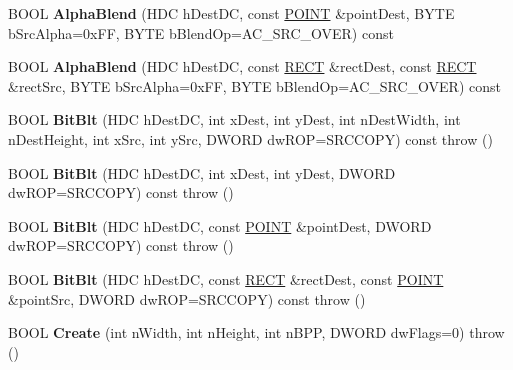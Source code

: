 \begin{DoxyCompactItemize}
B\+O\+OL {\bfseries Alpha\+Blend} (H\+DC h\+Dest\+DC, const \hyperlink{structtag_p_o_i_n_t}{P\+O\+I\+NT} \&point\+Dest, B\+Y\+TE b\+Src\+Alpha=0x\+F\+F, B\+Y\+T\+E b\+Blend\+Op=\+A\+C\+\_\+\+S\+R\+C\+\_\+\+O\+V\+E\+R) const
\item 
\mbox{\label{class_a_t_l_1_1_c_image_ac090e2014231cb296fd365c678f746d0}} 
B\+O\+OL {\bfseries Alpha\+Blend} (H\+DC h\+Dest\+DC, const \hyperlink{structtag_r_e_c_t}{R\+E\+CT} \&rect\+Dest, const \hyperlink{structtag_r_e_c_t}{R\+E\+CT} \&rect\+Src, B\+Y\+TE b\+Src\+Alpha=0x\+F\+F, B\+Y\+T\+E b\+Blend\+Op=\+A\+C\+\_\+\+S\+R\+C\+\_\+\+O\+V\+E\+R) const
\item 
\mbox{\label{class_a_t_l_1_1_c_image_a5d9e08f0e10a569bbbfc7155bc38f19c}} 
B\+O\+OL {\bfseries Bit\+Blt} (H\+DC h\+Dest\+DC, int x\+Dest, int y\+Dest, int n\+Dest\+Width, int n\+Dest\+Height, int x\+Src, int y\+Src, D\+W\+O\+RD dw\+R\+OP=S\+R\+C\+C\+O\+PY) const  throw ()
\item 
\mbox{\label{class_a_t_l_1_1_c_image_a1929e8b3407aa9c1525b146f6e18b29d}} 
B\+O\+OL {\bfseries Bit\+Blt} (H\+DC h\+Dest\+DC, int x\+Dest, int y\+Dest, D\+W\+O\+RD dw\+R\+OP=S\+R\+C\+C\+O\+PY) const  throw ()
\item 
\mbox{\label{class_a_t_l_1_1_c_image_ad10751bc076707e3bfb6dad450fb6614}} 
B\+O\+OL {\bfseries Bit\+Blt} (H\+DC h\+Dest\+DC, const \hyperlink{structtag_p_o_i_n_t}{P\+O\+I\+NT} \&point\+Dest, D\+W\+O\+RD dw\+R\+OP=S\+R\+C\+C\+O\+PY) const  throw ()
\item 
\mbox{\label{class_a_t_l_1_1_c_image_a014dfd0d52010953fef341e1b628aa64}} 
B\+O\+OL {\bfseries Bit\+Blt} (H\+DC h\+Dest\+DC, const \hyperlink{structtag_r_e_c_t}{R\+E\+CT} \&rect\+Dest, const \hyperlink{structtag_p_o_i_n_t}{P\+O\+I\+NT} \&point\+Src, D\+W\+O\+RD dw\+R\+OP=S\+R\+C\+C\+O\+PY) const  throw ()
\item 
\mbox{\label{class_a_t_l_1_1_c_image_a0a2328019c33d961579c9420f04f8378}} 
B\+O\+OL {\bfseries Create} (int n\+Width, int n\+Height, int n\+B\+PP, D\+W\+O\+RD dw\+Flags=0)  throw ()
\item 
\mbox{\label{class_a_t_l_1_1_c_image_a3c0c8e255ce5225270b1a77307a27ecb}} 

\end{DoxyCompactItemize}
